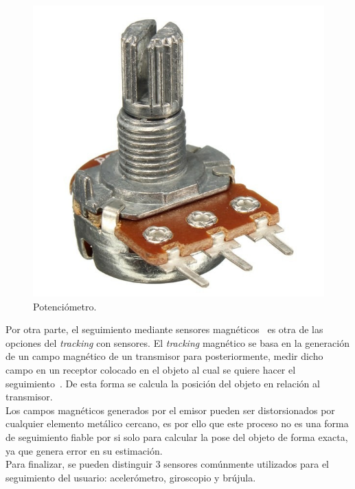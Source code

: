 \begin{itemize}
    \begin{figure}[H]
    \centering
    \includegraphics[scale=0.14]{Images/Estado del arte/potenciometro.jpg}
    \caption[Potenciómetro]{Potenciómetro\footnotemark.}
    \label{fig:potenciometro}
\end{figure}
    Por otra parte, el seguimiento mediante sensores magnéticos~\cite{magneticIntro} es otra de las opciones del \textit{tracking} con sensores. El \textit{tracking} magnético se basa en la generación de un campo magnético de un transmisor para posteriormente, medir dicho campo en un receptor colocado en el objeto al cual se quiere hacer el seguimiento~\cite{magneticExplanation}. De esta forma se calcula la posición del objeto en relación al transmisor.\\
    
    Los campos magnéticos generados por el emisor pueden ser distorsionados por cualquier elemento metálico cercano, es por ello que este proceso no es una forma de seguimiento fiable por si solo para calcular la pose del objeto de forma exacta, ya que genera error en su estimación.\\

    Para finalizar, se pueden distinguir 3 sensores comúnmente utilizados para el seguimiento del usuario: acelerómetro, giroscopio y brújula.\\
    

\end{itemize}

